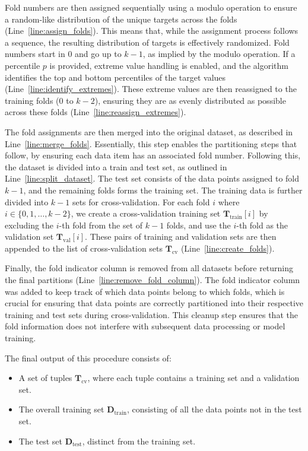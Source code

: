 Fold numbers are then assigned sequentially using a modulo operation to ensure a random-like distribution of the unique targets across the folds (Line~\ref{line:assign_folds}).
This means that, while the assignment process follows a sequence, the resulting distribution of targets is effectively randomized.
Fold numbers start in 0 and go up to $k-1$, as implied by the modulo operation.
If a percentile $p$ is provided, extreme value handling is enabled, and the algorithm identifies the top and bottom percentiles of the target values (Line~\ref{line:identify_extremes}).
These extreme values are then reassigned to the training folds (0 to $k-2$), ensuring they are as evenly distributed as possible across these folds (Line~\ref{line:reassign_extremes}).

The fold assignments are then merged into the original dataset, as described in Line~\ref{line:merge_folds}.
Essentially, this step enables the partitioning steps that follow, by ensuring each data item has an associated fold number.
Following this, the dataset is divided into a train and test set, as outlined in Line~\ref{line:split_dataset}.
The test set consists of the data points assigned to fold $k-1$, and the remaining folds forms the training set.
The training data is further divided into $k-1$ sets for cross-validation.
For each fold $i$ where $i \in \{0, 1, \ldots, k-2\}$, we create a cross-validation training set $\mathbf{T}_\text{train}[i]$ by excluding the $i$-th fold from the set of $k-1$ folds, and use the $i$-th fold as the validation set $\mathbf{T}_\text{val}[i]$.
These pairs of training and validation sets are then appended to the list of cross-validation sets $\mathbf{T}_\text{cv}$ (Line~\ref{line:create_folds}).

Finally, the fold indicator column is removed from all datasets before returning the final partitions (Line~\ref{line:remove_fold_column}).
The fold indicator column was added to keep track of which data points belong to which folds, which is crucial for ensuring that data points are correctly partitioned into their respective training and test sets during cross-validation.
This cleanup step ensures that the fold information does not interfere with subsequent data processing or model training.

The final output of this procedure consists of:
\begin{itemize}
    \item A set of tuples \(\mathbf{T}_\text{cv}\), where each tuple contains a training set and a validation set.
    \item The overall training set \(\mathbf{D}_\text{train}\), consisting of all the data points not in the test set.
    \item The test set \(\mathbf{D}_\text{test}\), distinct from the training set.
\end{itemize}

